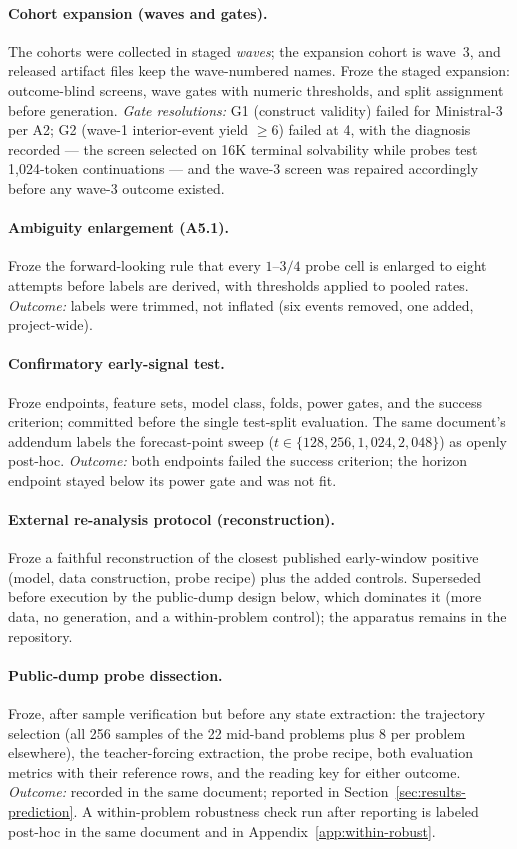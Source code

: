 \paragraph{Cohort expansion (waves and gates).}
The cohorts were collected in staged \emph{waves}; the expansion cohort
is wave~3, and released artifact files keep the wave-numbered names.
Froze the staged expansion: outcome-blind screens, wave gates with numeric
thresholds, and split assignment before generation. \emph{Gate
resolutions:} G1 (construct validity) failed for Ministral-3 per A2; G2
(wave-1 interior-event yield $\ge 6$) failed at 4, with the diagnosis
recorded --- the screen selected on 16K terminal solvability while probes
test 1{,}024-token continuations --- and the wave-3 screen was repaired
accordingly before any wave-3 outcome existed.

\paragraph{Ambiguity enlargement (A5.1).}
Froze the forward-looking rule that every $1$--$3/4$ probe cell is
enlarged to eight attempts before labels are derived, with thresholds
applied to pooled rates. \emph{Outcome:} labels were trimmed, not inflated
(six events removed, one added, project-wide).

\paragraph{Confirmatory early-signal test.}
Froze endpoints, feature sets, model class, folds, power gates, and the
success criterion; committed before the single test-split evaluation. The
same document's addendum labels the forecast-point sweep
($t \in \{128, 256, 1{,}024, 2{,}048\}$) as openly post-hoc.
\emph{Outcome:} both endpoints failed the success criterion; the horizon
endpoint stayed below its power gate and was not fit.

\paragraph{External re-analysis protocol (reconstruction).}
Froze a faithful reconstruction of the closest published early-window
positive (model, data construction, probe recipe) plus the added controls.
Superseded before execution by the public-dump design below, which
dominates it (more data, no generation, and a within-problem control);
the apparatus remains in the repository.

\paragraph{Public-dump probe dissection.}
Froze, after sample verification but before any state extraction: the
trajectory selection (all 256 samples of the 22 mid-band problems plus 8
per problem elsewhere), the teacher-forcing extraction, the probe recipe,
both evaluation metrics with their reference rows, and the reading key for
either outcome. \emph{Outcome:} recorded in the same document; reported in
Section~\ref{sec:results-prediction}. A within-problem robustness check
run after reporting is labeled post-hoc in the same document and in
Appendix~\ref{app:within-robust}.
